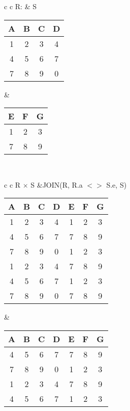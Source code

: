\begin{tabular}{ c c}
	R: & S \\
	\begin{tabular}{|c|c|c|c|}
		\hline
		A & B & C & D\\
		\hline
		1 & 2 & 3 & 4\\
		\hline
		4 & 5 & 6 & 7\\
		\hline
		7 & 8 & 9 & 0\\
		\hline
	\end{tabular} &

	\begin{tabular}{|c|c|c|}
		\hline
		E & F & G \\
		\hline
		1 & 2 & 3\\
		\hline
		7 & 8 & 9\\
		\hline
	\end{tabular}
\end{tabular}\\

\hspace{-0.5cm}
\begin{tabular}{ c c}
	R $\times$ S &JOIN(R, R.a $<>$ S.e, S)\\
	\begin{tabular}{|c|c|c|c|c|c|c|}
		\hline
		A & B & C & D & E & F & G\\
		\hline
		1 & 2 & 3 & 4 & 1 & 2 & 3\\
		\hline
		4 & 5 & 6 & 7 & 7 & 8 & 9\\
		\hline
		7 & 8 & 9 & 0 & 1 & 2 & 3\\
		\hline                     
		1 & 2 & 3 & 4 & 7 & 8 & 9\\
		\hline
		4 & 5 & 6 & 7 & 1 & 2 & 3\\
		\hline                     
		7 & 8 & 9 & 0 & 7 & 8 & 9\\
		\hline
	\end{tabular} &

	\begin{tabular}{|c|c|c|c|c|c|c|}
		\hline
		A & B & C & D & E & F & G\\
		\hline
		4 & 5 & 6 & 7 & 7 & 8 & 9\\
		\hline
		7 & 8 & 9 & 0 & 1 & 2 & 3\\
		\hline                     
		1 & 2 & 3 & 4 & 7 & 8 & 9\\
		\hline
		4 & 5 & 6 & 7 & 1 & 2 & 3\\
		\hline
	\end{tabular} 
\end{tabular} 

